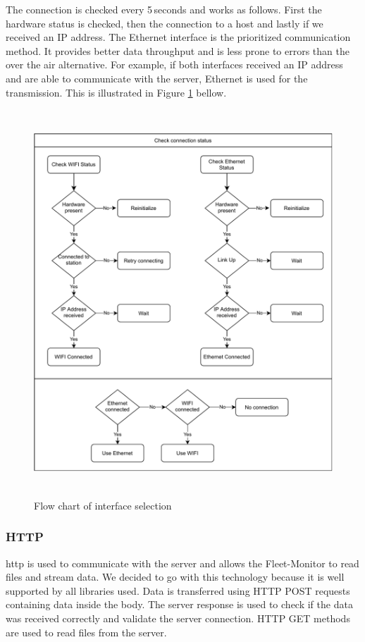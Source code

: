 The connection is checked every 5\,seconds and works as follows. First the hardware status is checked, then the connection to a host and lastly if we received an IP address. The Ethernet interface is the prioritized communication method. It provides better data throughput and is less prone to errors than the over the air alternative. For example, if both interfaces received an IP address and are able to communicate with the server, Ethernet is used for the transmission. This is illustrated in Figure \ref{fig:connectin-tree} bellow.
\begin{figure}[!ht]
	\centering
	\includegraphics[height=14.5cm]{images/connection-tree}
	\caption{Flow chart of interface selection}
	\label{fig:connectin-tree}
\end{figure}
\newpage

\subsubsection{HTTP}
\acrfull{http} is used to communicate with the server and allows the Fleet-Monitor to read files and stream data. We decided to go with this technology because it is well supported by all libraries used. Data is transferred using HTTP POST requests containing data inside the body. The server response is used to check if the data was received correctly and validate the server connection. HTTP GET methods are used to read files from the server.

